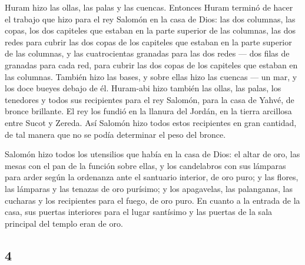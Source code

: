 \begin{paracol}{2}
 Huram hizo las ollas, las palas y las cuencas. Entonces
Huram terminó de hacer el trabajo que hizo para el rey Salomón en la
casa de Dios:  las dos columnas, las copas, los dos
capiteles que estaban en la parte superior de las columnas, las dos
redes para cubrir las dos copas de los capiteles que estaban en la parte
superior de las columnas,  y las cuatrocientas granadas
para las dos redes --- dos filas de granadas para cada red, para cubrir
las dos copas de los capiteles que estaban en las columnas.
 También hizo las bases, y sobre ellas hizo las cuencas
---  un mar, y los doce bueyes debajo de él.
 Huram-abi hizo también las ollas, las palas, los
tenedores y todos sus recipientes para el rey Salomón, para la casa de
Yahvé, de bronce brillante.  El rey los fundió en la
llanura del Jordán, en la tierra arcillosa entre Sucot y Zereda.
 Así Salomón hizo todos estos recipientes en gran
cantidad, de tal manera que no se podía determinar el peso del bronce.

 Salomón hizo todos los utensilios que había en la casa
de Dios: el altar de oro, las mesas con el pan de la función sobre
ellas,  y los candelabros con sus lámparas para arder
según la ordenanza ante el santuario interior, de oro puro;
 y las flores, las lámparas y las tenazas de oro
purísimo;  y los apagavelas, las palanganas, las cucharas
y los recipientes para el fuego, de oro puro. En cuanto a la entrada de
la casa, sus puertas interiores para el lugar santísimo y las puertas de
la sala principal del templo eran de oro.

\switchcolumn
\begin{otherlanguage}{english}

\hypertarget{section-7}{%
\section{4}\label{section-7}}


\end{otherlanguage}
\end{paracol}
